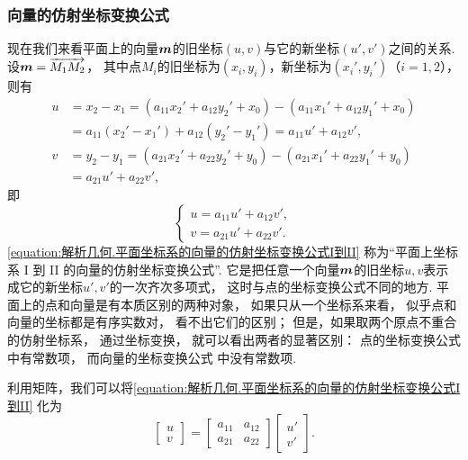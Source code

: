\subsubsection{向量的仿射坐标变换公式}
现在我们来看平面上的向量\(\boldsymbol{m}\)的旧坐标\((u,v)\)与它的新坐标\((u',v')\)之间的关系.
设\(\boldsymbol{m}=\overrightarrow{M_1 M_2}\)，
其中点\(M_i\)的旧坐标为\((x_i,y_i)\)，新坐标为\((x_i',y_i')\)（\(i=1,2\)），
则有\begin{align*}
	u &= x_2 - x_1
	= (a_{11} x_2' + a_{12} y_2' + x_0)
	- (a_{11} x_1' + a_{12} y_1' + x_0) \\
	&= a_{11} (x_2' - x_1')
	+ a_{12} (y_2' - y_1')
	= a_{11} u' + a_{12} v', \\
	v &= y_2 - y_1
	= (a_{21} x_2' + a_{22} y_2' + y_0)
	- (a_{21} x_1' + a_{22} y_1' + y_0) \\
	&= a_{21} u' + a_{22} v',
\end{align*}
即\begin{equation}\label{equation:解析几何.平面坐标系的向量的仿射坐标变换公式I到II}
	\left\{ \begin{array}{l}
		u = a_{11} u' + a_{12} v', \\
		v = a_{21} u' + a_{22} v'.
	\end{array} \right.
\end{equation}
\cref{equation:解析几何.平面坐标系的向量的仿射坐标变换公式I到II}
称为“平面上坐标系 I 到 II 的向量的仿射坐标变换公式”.
它是把任意一个向量\(\boldsymbol{m}\)的旧坐标\(u,v\)表示成它的新坐标\(u',v'\)的一次齐次多项式，
这时与点的坐标变换公式不同的地方.
平面上的点和向量是有本质区别的两种对象，
如果只从一个坐标系来看，
似乎点和向量的坐标都是有序实数对，
看不出它们的区别；
但是，如果取两个原点不重合的仿射坐标系，
通过坐标变换，
就可以看出两者的显著区别：
点的坐标变换公式  中有常数项，
而向量的坐标变换公式  中没有常数项.

利用矩阵，我们可以将\cref{equation:解析几何.平面坐标系的向量的仿射坐标变换公式I到II}
化为\begin{equation}\label{equation:解析几何.平面坐标系的向量的仿射坐标变换公式I到II.矩阵形式1}
	\begin{bmatrix}
		u \\ v
	\end{bmatrix}
	= \begin{bmatrix}
		a_{11} & a_{12} \\
		a_{21} & a_{22}
	\end{bmatrix} \begin{bmatrix}
		u' \\ v'
	\end{bmatrix}.
\end{equation}

